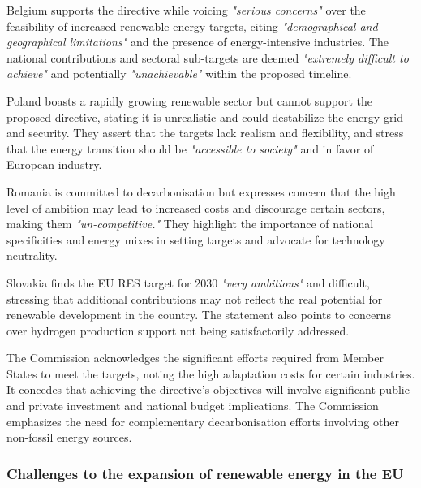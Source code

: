 \begin{description}[style=nextline]

    \item[Belgium] Belgium supports the directive while voicing \textit{"serious concerns"} over the feasibility of increased renewable energy targets, citing \textit{"demographical and geographical limitations"} and the presence of energy-intensive industries. The national contributions and sectoral sub-targets are deemed \textit{"extremely difficult to achieve"} and potentially \textit{"unachievable"} within the proposed timeline.

    \item[Poland] Poland boasts a rapidly growing renewable sector but cannot support the proposed directive, stating it is unrealistic and could destabilize the energy grid and security. They assert that the targets lack realism and flexibility, and stress that the energy transition should be \textit{"accessible to society"} and in favor of European industry.

    \item[Romania] Romania is committed to decarbonisation but expresses concern that the high level of ambition may lead to increased costs and discourage certain sectors, making them \textit{"un-competitive."} They highlight the importance of national specificities and energy mixes in setting targets and advocate for technology neutrality.

    \item[Slovak Republic] Slovakia finds the EU RES target for 2030 \textit{"very ambitious"} and difficult, stressing that additional contributions may not reflect the real potential for renewable development in the country. The statement also points to concerns over hydrogen production support not being satisfactorily addressed.

    \item[European Commission] The Commission acknowledges the significant efforts required from Member States to meet the targets, noting the high adaptation costs for certain industries. It concedes that achieving the directive's objectives will involve significant public and private investment and national budget implications. The Commission emphasizes the need for complementary decarbonisation efforts involving other non-fossil energy sources.

\end{description}

\subsubsection{Challenges to the expansion of renewable energy in the EU}

